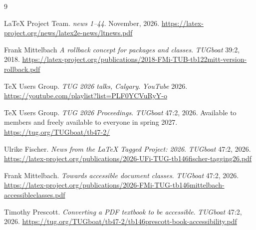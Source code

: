\documentclass{ltnews}
\begin{document}
\begin{thebibliography}{9}\frenchspacing

 \LaTeX{} Project Team.
  \emph{\LaTeXe{} news 1--44}. November, 2026.
  \url{https://latex-project.org/news/latex2e-news/ltnews.pdf}

 Frank Mittelbach
  \emph{A rollback concept for packages and classes}. \textsl{TUGboat} 39:2, 2018.
  \url{https://latex-project.org/publications/2018-FMi-TUB-tb122mitt-version-rollback.pdf}
  
  \TeX{} Users Group.
  \emph{TUG 2026 talks, Calgary}. \textsl{YouTube} 2026.
  \url{https://youtube.com/playlist?list=PLF0YCVuRyY-o}

  
 \TeX{} Users Group.
  \emph{TUG 2026 Proceedings}. \textsl{TUGboat} 47:2, 2026.
  Available to members and freely available to everyone in spring 2027.
  \url{https://tug.org/TUGboat/tb47-2/}

 Ulrike Fischer.
  \emph{News from the \LaTeX{} Tagged Project: 2026}. \textsl{TUGboat} 47:2, 2026.
  \url{https://latex-project.org/publications/2026-UFi-TUG-tb146fischer-tagging26.pdf}
  
 Frank Mittelbach.
  \emph{Towards accessible document classes}. \textsl{TUGboat} 47:2, 2026.
  \url{https://latex-project.org/publications/2026-FMi-TUG-tb146mittelbach-accessibleclasses.pdf}
  

 Timothy Prescott.
  \emph{Converting a PDF textbook to be accessible}. \textsl{TUGboat} 47:2, 2026.
  \url{https://tug.org/TUGboat/tb47-2/tb146prescott-book-accessibility.pdf}

  
\end{thebibliography}
\end{document}
